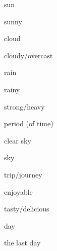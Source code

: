 \documentclass[avery5371,grid,frame]{flashcards}
\begin{document}
\begin{flashcard}{\LARGE sun}
\LARGE {}
\end{flashcard}
\begin{flashcard}{\LARGE sunny}
\LARGE {}
\end{flashcard}
\begin{flashcard}{\LARGE cloud}
\LARGE {}
\end{flashcard}
\begin{flashcard}{\LARGE cloudy/overcast}
\LARGE {}
\end{flashcard}
\begin{flashcard}{\LARGE rain}
\LARGE {}
\end{flashcard}
\begin{flashcard}{\LARGE rainy}
\LARGE {}
\end{flashcard}
\begin{flashcard}{\LARGE strong/heavy}
\LARGE {}
\end{flashcard}
\begin{flashcard}{\LARGE period (of time)}
\LARGE {}
\end{flashcard}
\begin{flashcard}{\LARGE clear sky}
\LARGE {}
\end{flashcard}
\begin{flashcard}{\LARGE sky}
\LARGE {}
\end{flashcard}
\begin{flashcard}{\LARGE trip/journey}
\LARGE {}
\end{flashcard}
\begin{flashcard}{\LARGE enjoyable}
\LARGE {}
\end{flashcard}
\begin{flashcard}{\LARGE tasty/delicious}
\LARGE {}
\end{flashcard}
\begin{flashcard}{\LARGE day}
\LARGE {}
\end{flashcard}
\begin{flashcard}{\LARGE the last day}
\LARGE {}
\end{flashcard}
\end{document}
